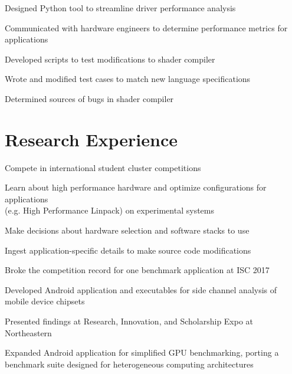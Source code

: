 \documentclass[]{deedy-resume-openfont}
\begin{document}
\vspace{2mm}
\vspace{1mm}
\begin{tightemize}
\item Designed Python tool to streamline driver performance analysis
\item Communicated with hardware engineers to determine performance metrics for applications
\item Developed scripts to test modifications to shader compiler
\item Wrote and modified test cases to match new language specifications
\item Determined sources of bugs in shader compiler
\end{tightemize}

\section{\hfill Research Experience \hfill}

\vspace{0.8mm}
\begin{tightemize}
\item Compete in international student cluster competitions
\item Learn about high performance hardware and optimize configurations for applications \\(e.g. High Performance Linpack) on experimental systems
\item Make decisions about hardware selection and software stacks to use
\item Ingest application-specific details to make source code modifications
\item Broke the competition record for one benchmark application at ISC 2017
\end{tightemize}

\vspace{2mm}
\vspace{1mm}
\begin{tightemize}
\item Developed Android application and executables for side channel analysis of mobile device chipsets
\item Presented findings at Research, Innovation, and Scholarship Expo at Northeastern
\item Expanded Android application for simplified GPU benchmarking, porting a benchmark suite designed for heterogeneous computing architectures
\end{tightemize}
\end{document}
